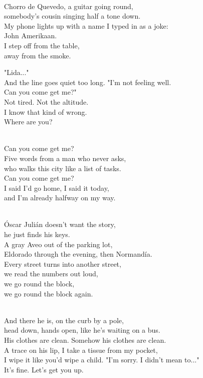 \begin{lyrics}

\\
Chorro de Quevedo, a guitar going round,\\
somebody's cousin singing half a tone down.\\
My phone lights up with a name I typed in as a joke:\\
John Amerikaan.\\
I step off from the table,\\
away from the smoke.

 "Lida..."
\\
And the line goes quiet too long.
 "I'm not feeling well.\\
Can you come get me?"
\\
Not tired. Not the altitude.\\
I know that kind of wrong.
\\
Where are you?

\\
Can you come get me?\\
Five words from a man who never asks,\\
who walks this city like a list of tasks.\\
Can you come get me?\\
I said I'd go home, I said it today,\\
and I'm already halfway on my way.

\\
Óscar Julián doesn't want the story,\\
he just finds his keys.\\
A gray Aveo out of the parking lot,\\
Eldorado through the evening, then Normandía.\\
Every street turns into another street,\\
we read the numbers out loud,\\
we go round the block,\\
we go round the block again.

\\
And there he is, on the curb by a pole,\\
head down, hands open, like he's waiting on a bus.\\
His clothes are clean. Somehow his clothes are clean.\\
A trace on his lip, I take a tissue from my pocket,\\
I wipe it like you'd wipe a child.
"I'm sorry. I didn't mean to..."
\\
It's fine. Let's get you up.


\end{lyrics}
